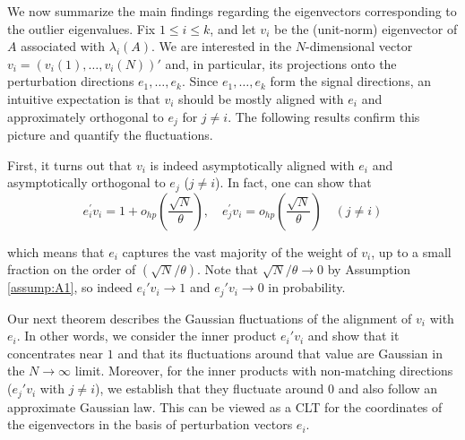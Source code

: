 \documentclass[11pt, reqno]{amsart}
\numberwithin{equation}{section}
\begin{document}
We now summarize the main findings regarding the eigenvectors corresponding to the outlier eigenvalues. Fix $1 \le i \le k$, and let $v_i$ be the (unit-norm) eigenvector of $A$ associated with $\lambda_i(A)$. We are interested in the $N$-dimensional vector $v_i = (v_i(1), \ldots, v_i(N))'$ and, in particular, its projections onto the perturbation directions $e_1,\ldots,e_k$. Since ${e_1,\ldots,e_k}$ form the signal directions, an intuitive expectation is that $v_i$ should be mostly aligned with $e_i$ and approximately orthogonal to $e_j$ for $j\ne i$. The following results confirm this picture and quantify the fluctuations.


First, it turns out that $v_i$ is indeed asymptotically aligned with $e_i$ and asymptotically orthogonal to $e_j$ ($j\ne i$). In fact, one can show that
\[
e_i^{\prime} v_i=1+o_{hp}\left(\frac{\sqrt{N}}{\theta}\right), \quad e_j^{\prime} v_i=o_{hp}\left(\frac{\sqrt{N}}{\theta}\right) \quad(j \neq i)
\]

which means that $e_i$ captures the vast majority of the weight of $v_i$, up to a small fraction on the order of $(\sqrt{N}/\theta)$. Note that $\sqrt{N}/\theta \to 0$ by Assumption \ref{assump:A1}, so indeed $e_i'v_i \to 1$ and $e_j'v_i \to 0$ in probability. 


Our next theorem describes the Gaussian fluctuations of the alignment of $v_i$ with $e_i$. In other words, we consider the inner product $e_i' v_i$ and show that it concentrates near $1$ and that its fluctuations around that value are Gaussian in the $N\to\infty$ limit. Moreover, for the inner products with non-matching directions ($e_j' v_i$ with $j\ne i$), we establish that they fluctuate around 0 and also follow an approximate Gaussian law. This can be viewed as a CLT for the coordinates of the eigenvectors in the basis of perturbation vectors ${e_i}$.
\end{document}
